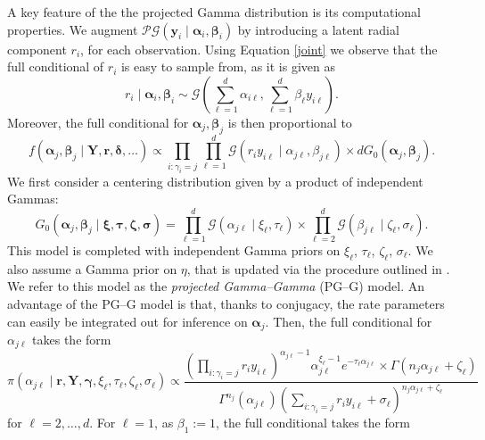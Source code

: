 A key feature of the the projected Gamma distribution is its computational properties. We augment  $\mathcal{PG}(\bm{y}_i\mid\bm{\alpha}_i,\bm{\beta}_i) $ by introducing a latent radial component $r_i$, for each observation. Using Equation \eqref{joint} we observe that the 
full conditional of $r_i$ is easy to sample from, as it is given as
\begin{equation}
    r_i\mid\bm{\alpha}_i,\bm{\beta}_i \sim \mathcal{G}\left(\sum_{\ell = 1}^d\alpha_{i\ell}, \sum_{\ell = 1}^d\beta_{\ell} y_{i\ell}\right).
\end{equation}
Moreover,  the full conditional for $\bm{\alpha}_j,\bm{\beta}_j$ is then proportional to
\begin{equation}
    f(\bm{\alpha}_j,\bm{\beta}_j\mid \bm{Y},\bm{r},\bm{\delta},\ldots) \propto \prod_{i:\gamma_i = j}\prod_{\ell = 1}^d\mathcal{G}\left(r_iy_{i\ell}\mid\alpha_{j\ell},\beta_{j\ell}\right) \times dG_0(\bm{\alpha}_j,\bm{\beta}_j).
\end{equation}
We first consider a centering distribution given by a product of independent Gammas:
\begin{equation}
    G_0(\bm{\alpha}_j,\bm{\beta}_j\mid \bm{\xi},\bm{\tau},\bm{\zeta},\bm{\sigma}) = \prod_{\ell = 1}^d\mathcal{G}(\alpha_{j\ell}\mid \xi_{\ell},\tau_{\ell})\times\prod_{\ell = 2}^d\mathcal{G}(\beta_{j\ell}\mid\zeta_{\ell},\sigma_{\ell}).
\end{equation}
This model is completed with independent Gamma priors on $\xi_{\ell}$, $\tau_{\ell}$, $\zeta_{\ell}$, $\sigma_{\ell}$.  We also assume a Gamma prior on $\eta$, that is updated via the procedure outlined in \cite{escobar1995}.  We refer to this model as the \emph{projected Gamma--Gamma} (PG--G) model.  An advantage of the PG--G model is that, thanks to conjugacy, the rate parameters can easily be integrated out for inference on $\bm{\alpha}_j$.  Then, the full conditional for $\alpha_{j\ell}$ takes the form
\begin{equation}
    \pi(\alpha_{j\ell}\mid \bm{r},\bm{Y},\bm{\gamma},\xi_\ell,\tau_\ell,\zeta_\ell,\sigma_\ell) \propto \frac{\left(\prod_{i:\gamma_i = j}r_iy_{i\ell}\right)^{\alpha_{j\ell} - 1}\alpha_{j\ell}^{\xi_\ell - 1}e^{-\tau_\ell \alpha_{j\ell}}\times\Gamma\left(n_j\alpha_{j\ell} + \zeta_{\ell}\right)}{\Gamma^{n_j}(\alpha_{j\ell})\left(\sum_{i:\gamma_i = j}r_iy_{i\ell} + \sigma_{\ell}\right)^{n_j\alpha_{j\ell} + \zeta_{\ell}}}
\end{equation}
for $\ell = 2,\ldots,d$.  For $\ell = 1$, as $\beta_{1} := 1$, the full conditional takes the form
